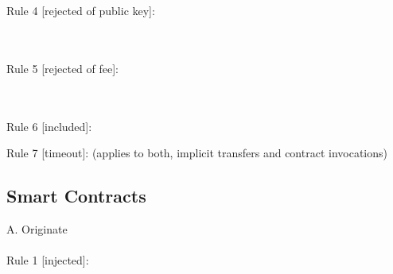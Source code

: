 \documentclass[a4paper]{llncs}
\begin{document}
~\\
~\\
Rule 4 [rejected of public key]:
\begin{mathpar}
\end{mathpar}
~\\
~\\
Rule 5 [rejected of fee]:
\begin{mathpar}
\end{mathpar}
~\\
~\\
Rule 6 [included]:
\begin{mathpar}
\end{mathpar}
Rule 7 [timeout]: (applies to both, implicit transfers and contract invocations)
\begin{mathpar}
\end{mathpar}

\subsection{Smart Contracts}
A. Originate
~\\
~\\
Rule 1 [injected]:
\end{document}

